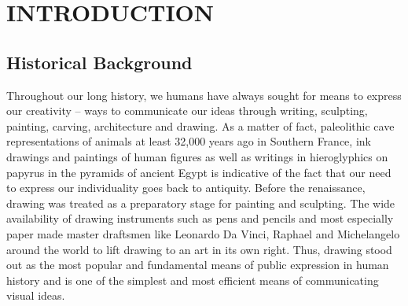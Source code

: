 \chapter{INTRODUCTION} %

\section{Historical Background}
\hspace{30}Throughout our long history, we humans have always sought for means 
to express our creativity – ways to communicate our ideas through writing, 
sculpting, painting, carving, architecture and drawing. As a matter of fact,
paleolithic cave representations of animals at least 32,000 years ago in  
Southern France, ink drawings and paintings of human figures as well as writings 
in hieroglyphics on papyrus in the pyramids of ancient Egypt is
indicative of the fact that our need to express our individuality goes back to
antiquity. Before the renaissance, drawing was treated as a preparatory stage
for painting and sculpting. The wide availability of drawing instruments such as 
pens and pencils and most especially paper made master draftsmen like
Leonardo Da Vinci, Raphael and Michelangelo around the world to lift drawing
to an art in its own right. Thus, drawing stood out as the most popular and
fundamental means of public expression in human history and is one of the
simplest and most efficient means of communicating visual ideas. \cite{1}\\


